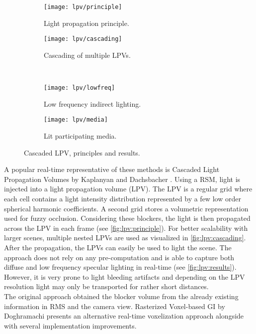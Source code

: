 \documentclass[thesis.tex]{subfiles}
\begin{document}
\begin{figure}[h]
\centering
\begin{subfigure}[b]{0.35\textwidth}
\centering
\texttt{[image: lpv/principle]}
\caption{Light propagation principle.}
\label{fig:lpv:principle}
\end{subfigure}
\begin{subfigure}[b]{0.53\textwidth}
\centering
\texttt{[image: lpv/cascading]}
\caption{Cascading of multiple LPVs.}
\label{fig:lpv:cascading}
\end{subfigure}
\\
\begin{subfigure}[b]{0.48\textwidth}
\centering
\texttt{[image: lpv/lowfreq]}
\caption{Low frequency indirect lighting.}
\label{fig:lpv:results}
\end{subfigure}
\begin{subfigure}[b]{0.48\textwidth}
\centering
\texttt{[image: lpv/media]}
\caption{Lit participating media.}
\end{subfigure}
\caption{\cite{bib:lpt} Cascaded LPV, principles and results.}
\end{figure}
A popular real-time representative of these methods is Cascaded Light Propagation Volumes by Kaplanyan and Dachsbacher \cite{bib:lpt}.
Using a RSM, light is injected into a light propagation volume (LPV).
The LPV is a regular grid where each cell contains a light intensity distribution represented by a few low order spherical harmonic coefficients.
A second grid stores a volumetric representation used for fuzzy occlusion.
Considering these blockers, the light is then propagated across the LPV in each frame (see \autoref{fig:lpv:principle}).
For better scalability with larger scenes, multiple nested LPVs are used as visualized in \autoref{fig:lpv:cascading}.
After the propagation, the LPVs can easily be used to light the scene.
The approach does not rely on any pre-computation and is able to capture both diffuse and low frequency specular lighting in real-time (see \autoref{fig:lpv:results}).
However, it is very prone to light bleeding artifacts and depending on the LPV resolution light may only be transported for rather short distances.
\\
The original approach obtained the blocker volume from the already existing information in RMS and the camera view.
Rasterized Voxel-based GI by Doghramachi \cite{bib:rasterizedvbgi} presents an alternative real-time voxelization approach alongside with several implementation improvements.
\end{document}
